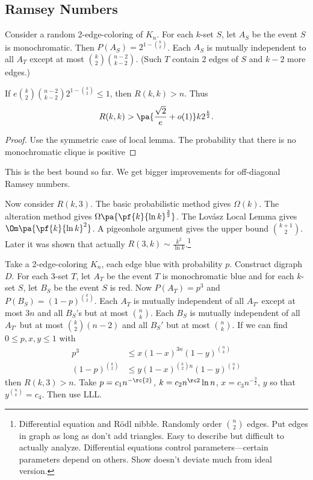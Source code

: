 \subsection{Ramsey Numbers}
Consider a random 2-edge-coloring of $K_n$. For each $k$-set $S$, let $A_S$ be the event $S$ is monochromatic. Then $P(A_S)=2^{1-\binom k2}$. Each $A_S$ is mutually independent to all $A_T$ except at most $\binom k2\binom{n-2}{k-2}$. (Such $T$ contain 2 edges of $S$ and $k-2$ more edges.)
\begin{pr}
If $e\binom k2 \binom{n-2}{k-2}2^{1-\binom k2}\leq 1$, then $R(k,k)>n$. Thus
\[
R(k,k)>\pa{\frac{\sqrt{2}}{e}+o(1)}k2^{\frac k2}.
\]
\end{pr}
\begin{proof}
Use the
symmetric case of local lemma. The probability that there is no monochromatic clique is positive
\end{proof}
This is the best bound so far. We get bigger improvements for off-diagonal Ramsey numbers.

Now consider $R(k,3)$. The basic probabilistic method gives $\Omega(k)$. The alteration method gives $\Omega\pa{\pf{k}{\ln k}^{\frac 32}}$. The Lov\'asz Local Lemma gives $\Om\pa{\pf{k}{\ln k}^2}$. A pigeonhole argument gives the upper bound $\binom{k+1}{2}$. Later it was shown that actually $R(3,k)\sim \frac{k^2}{\ln k}$.\footnote{Differential equation and R\"odl nibble. Randomly order $\binom n2$ edges. Put edges in graph as long as don't add triangles. Easy to describe but difficult to actually analyze. Differential equations control parameters---certain parameters depend on others. Show doesn't deviate much from ideal version.}

Take a 2-edge-coloring $K_n$, each edge blue with probability $p$. Construct digraph $D$. For each 3-set $T$, let $A_T$ be the event $T$ is monochromatic blue and for each $k$-set $S$, let $B_S$ be the event $S$ is red. Now $P(A_T)=p^3$ and $P(B_S)=(1-p)^{\binom k2}$. Each $A_T$ is mutually independent of all $A_{T'}$ except at most $3n$ and all $B_S$'s but at most $\binom nk$. Each $B_S$ is mutually independent of all $A_{T'}$ but at most $\binom k2(n-2)$ and all $B_S'$ but at most $\binom nk$. If we can find $0\leq p,x,y\leq 1$ with
\begin{align*}
p^3&\leq x(1-x)^{3n}(1-y)^{\binom nk}\\
(1-p)^{\binom k2}&\leq y(1-x)^{\binom k2 n}(1-y)^{\binom nk}
\end{align*}
then $R(k,3)>n$. Take $p=c_1n^{-\rc{2}}$, $k=c_2n^{\rc 2}\ln n$, $x=c_3n^{-\frac 32}$, $y$ so that $y^{\binom nk}=c_4$. Then use LLL.